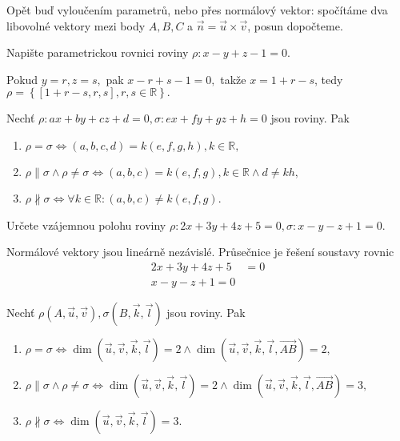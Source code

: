 \begin{reseni}
Opět buď vyloučením parametrů, nebo přes normálový vektor: spočítáme dva libovolné vektory
mezi body $A,B,C$ a $\vec n = \vec u \times \vec v$, posun dopočteme.
\end{reseni}

\begin{priklad}
Napište parametrickou rovnici roviny $\rho: x-y+z-1=0.$
\end{priklad}

\begin{reseni}
Pokud $y=r, z=s,$ pak $x-r+s-1=0,$ takže $x=1+r-s$, tedy $\rho = \left \{ [1+r-s,r,s],r,s\in \mathbb R \right \}. $
\end{reseni}

\begin{veta}
    Nechť $\rho: ax+by+cz+d=0, \sigma: ex+fy+gz+h=0$ jsou roviny. Pak
    \begin{enumerate}[$i.$]
    \item $\rho = \sigma \iff (a,b,c,d) = k(e,f,g,h), k\in \mathbb R,$
   	\item $\rho \parallel \sigma \land \rho \ne \sigma \iff (a,b,c) = k(e,f,g), k\in \mathbb R
    \land d\ne kh,$
   	\item $\rho \nparallel \sigma \iff \forall k \in \mathbb R: (a,b,c) \ne k(e,f,g)$.
    \end{enumerate}
\end{veta}

\begin{priklad}
Určete vzájemnou polohu roviny $\rho:2x+3y+4z+5=0, \sigma: x-y-z+1=0$.
\end{priklad}

\begin{reseni}
Normálové vektory jsou lineárně nezávislé. Průsečnice je řešení soustavy rovnic
\begin{align*}
    2x+3y+4z+5& =0\\
    x-y-z+1=0
\end{align*}
\end{reseni}

\begin{veta}
    Nechť $\rho(A,\vec u, \vec v), \sigma(B,\vec k, \vec l)$ jsou roviny. Pak
    \begin{enumerate}[$i.$]
    \item $\rho = \sigma \iff \dim (\vec u, \vec v, \vec k, \vec l) = 2 \land \dim (\vec u, \vec v, \vec k, \vec l, \overrightarrow{AB})=2,$
   	\item $\rho \parallel \sigma \land \rho \ne \sigma \iff \dim (\vec u, \vec v, \vec k, \vec l) = 2 \land \dim (\vec u, \vec v, \vec k, \vec l, \overrightarrow{AB})=3,$
   	\item $\rho \nparallel \sigma \iff \dim (\vec u, \vec v, \vec k, \vec l) = 3$.
    \end{enumerate}
\end{veta}

